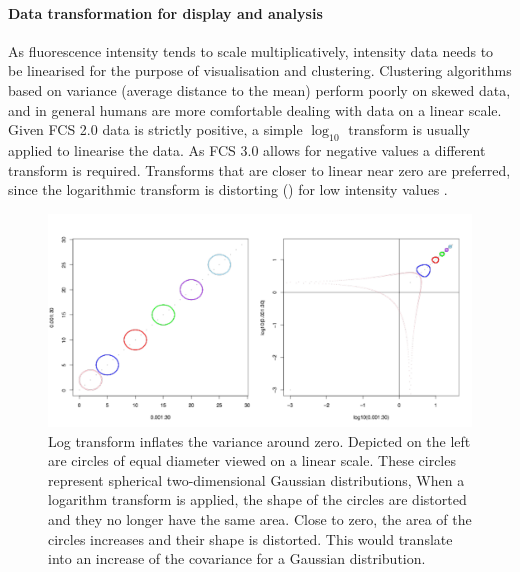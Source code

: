 \paragraph{Data transformation for display and analysis}
As fluorescence intensity tends to scale multiplicatively, intensity data needs to be linearised for the purpose of visualisation and clustering.
Clustering algorithms based on variance (average distance to the mean) perform poorly on skewed data, and in general humans are more comfortable dealing
with data on a linear scale.
Given FCS 2.0 data is strictly positive, a simple $\log_{10}$ transform is usually applied to linearise the data.
As FCS 3.0 allows for negative values a different transform is required.
Transforms that are closer to linear near zero are preferred, 
since the logarithmic transform is distorting ()
for low intensity values \citep{Durbin:2002tj,Tung:2006uw}.
\begin{figure}
\centering
\includegraphics[scale=.5] {figures/log10-deform.pdf}
{Log transform inflates the variance around zero.}
{
  Depicted on the left are circles of equal diameter viewed on a linear scale.
  These circles represent spherical two-dimensional Gaussian distributions, 
  When a logarithm transform is applied, the shape of the circles are distorted and they no longer have the same area.
  Close to zero, the area of the circles increases and their shape is distorted.
  This would translate into an increase of the covariance for a Gaussian distribution.
}
\end{figure}
